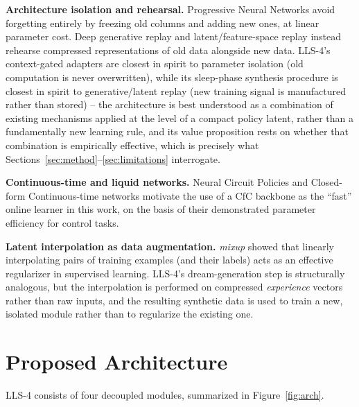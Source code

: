 \documentclass[11pt]{article}
\begin{document}
\textbf{Architecture isolation and rehearsal.} Progressive Neural Networks \cite{rusu2016} avoid forgetting entirely by freezing old columns and adding new ones, at linear parameter cost. Deep generative replay \cite{shin2017} and latent/feature-space replay \cite{pellegrini2020,rebuffi2017} instead rehearse compressed representations of old data alongside new data. LLS-4's context-gated adapters are closest in spirit to parameter isolation (old computation is never overwritten), while its sleep-phase synthesis procedure is closest in spirit to generative/latent replay (new training signal is manufactured rather than stored) -- the architecture is best understood as a combination of existing mechanisms applied at the level of a compact policy latent, rather than a fundamentally new learning rule, and its value proposition rests on whether that combination is empirically effective, which is precisely what Sections~\ref{sec:method}--\ref{sec:limitations} interrogate.

\textbf{Continuous-time and liquid networks.} Neural Circuit Policies \cite{lechner2020} and Closed-form Continuous-time networks \cite{hasani2022} motivate the use of a CfC backbone as the ``fast'' online learner in this work, on the basis of their demonstrated parameter efficiency for control tasks.

\textbf{Latent interpolation as data augmentation.} \emph{mixup} \cite{zhang2018} showed that linearly interpolating pairs of training examples (and their labels) acts as an effective regularizer in supervised learning. LLS-4's dream-generation step is structurally analogous, but the interpolation is performed on compressed \emph{experience} vectors rather than raw inputs, and the resulting synthetic data is used to train a new, isolated module rather than to regularize the existing one.

\section{Proposed Architecture}
\label{sec:arch}

LLS-4 consists of four decoupled modules, summarized in Figure~\ref{fig:arch}.
\end{document}
